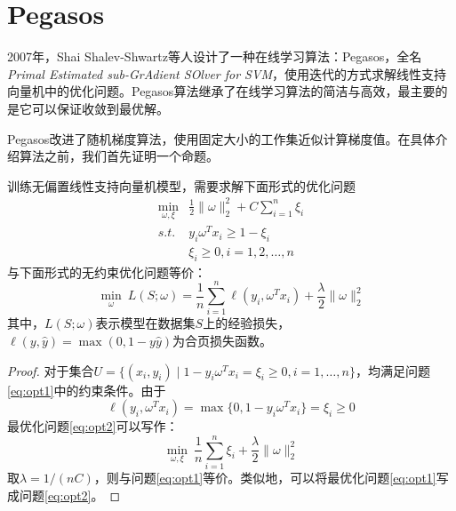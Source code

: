 \section{Pegasos}
2007年，Shai Shalev-Shwartz等人\cite{shalev2007pegasos,shalev2011pegasos}设计了一种在线学习算法：Pegasos，全名\textit{Primal Estimated sub-GrAdient SOlver for SVM}，使用迭代的方式求解线性支持向量机中的优化问题。Pegasos算法继承了在线学习算法的简洁与高效，最主要的是它可以保证收敛到最优解。

Pegasos改进了随机梯度算法，使用固定大小的工作集近似计算梯度值。在具体介绍算法之前，我们首先证明一个命题。
\begin{theorem}
训练无偏置线性支持向量机模型，需要求解下面形式的优化问题
\begin{equation}\label{eq:opt1}
    \begin{array}{ll}
      \min\limits_{\omega,\xi} & \frac{1}{2}\|\omega\|_2^2 + C\sum\limits_{i=1}^n\xi_i\\
      \textit{s.t.} & y_i \omega^T x_i \ge 1 - \xi_i \\
      & \xi_i \ge 0 ,i = 1,2,\ldots,n
    \end{array}
\end{equation}
与下面形式的无约束优化问题等价：
\begin{equation}\label{eq:opt2}
    \min\limits_{\omega}~ L(S; \omega) = \frac{1}{n} \sum\limits_{i=1}^n \ell(y_i, \omega^T x_i) + \frac{\lambda}{2} \|\omega\|_2^2
\end{equation}
其中，$L(S;\omega)$表示模型在数据集$S$上的经验损失，$\ell(y, \hat y) = \max (0, 1-y \hat y)$为合页损失函数。
\end{theorem}

\begin{proof}
对于集合$U=\{(x_i,y_i) \mid 1-y_i \omega^T x_i=\xi_i\ge 0, i=1,\ldots,n\}$，均满足问题\eqref{eq:opt1}中的约束条件。由于
\begin{equation}
    \ell(y_i, \omega^T x_i) = \max \{0, 1-y_i \omega^T x_i\} = \xi_i \ge 0
\end{equation}
最优化问题\eqref{eq:opt2}可以写作：
\begin{equation}
    \min\limits_{\omega,\xi}~ \frac{1}{n} \sum\limits_{i=1}^n \xi_i + \frac{\lambda}{2} \|\omega\|_2^2
\end{equation}
取$\lambda = 1/(nC)$，则与问题\eqref{eq:opt1}等价。类似地，可以将最优化问题\eqref{eq:opt1}写成问题\eqref{eq:opt2}。
\end{proof}

